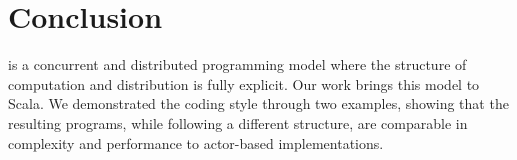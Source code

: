 \section*{Conclusion}
\apgas is a concurrent and distributed programming model where the structure of
computation and distribution is fully explicit. Our work brings this model to
Scala. We demonstrated the coding style through two examples, showing that the
resulting programs, while following a different structure, are comparable in
complexity and performance to actor-based implementations.
